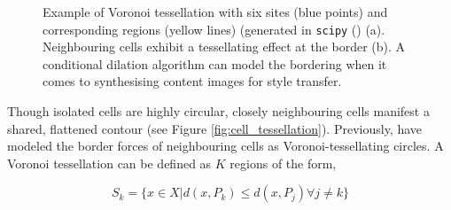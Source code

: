 \begin{figure}%
    \centering
    \qquad
    \qquad
    \caption{Example of Voronoi tessellation with six sites (blue points) and corresponding regions (yellow lines) (generated in \texttt{scipy} (\cite{2020SciPy-NMeth}) (a). Neighbouring cells exhibit a tessellating effect at the border (b). A conditional dilation algorithm can model the bordering when it comes to synthesising content images for style transfer.}%
    \label{fig:conditional_dilation}%
\end{figure}

Though isolated cells are highly circular, closely neighbouring cells manifest a shared, flattened contour (see Figure \ref{fig:cell_tessellation}). Previously, \cite{bock2010generalized} have modeled the border forces of neighbouring cells as Voronoi-tessellating circles. A Voronoi tessellation can be defined as $K$ regions of the form,

\begin{equation}
S_k = \Big\{x \in X | d(x, P_k) \leq d(x, P_j) \forall j \neq k \Big\}
\label{eq:voronoi}
\end{equation}


